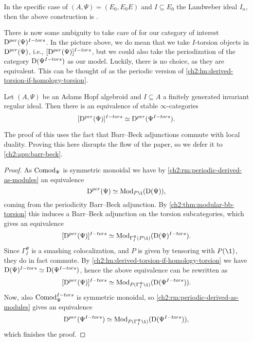 \begin{remark}
    In the specific case of $(A, \Psi) = (E_0, E_0E)$ and $I\subseteq E_0$ the Landweber ideal $I_n$, then the above construction is \cite[3.12]{barthel-schlank-stapleton_2021}. 
\end{remark}

There is now some ambiguity to take care of for our category of interest $\mathrm{D}^{per}(\Psi)^{I-tors}$. In the picture above, we do mean that we take $I$-torsion objects in $\mathrm{D}^{per}(\Psi)$, i.e., $[\mathrm{D}^{per}(\Psi)]^{I-tors}$, but we could also take the periodization of the category $\mathrm{D}(\Psi^{I-tors})$ as our model. Luckily, there is no choice, as they are equivalent. This can be thought of as the periodic version of \cref{ch2:lm:derived-torsion-if-homology-torsion}.

\begin{theorem}
    \label{ch2:thm:pulling-out-torsion}
    Let $(A, \Psi)$ be an Adams Hopf algebroid and $I\subseteq A$ a finitely generated invariant regular ideal. Then there is an equivalence of stable $\infty$-categories 
    $$[\mathrm{D}^{per}(\Psi)]^{I-tors}\simeq \mathrm{D}^{per}(\Psi^{I-tors}).$$
\end{theorem}

The proof of this uses the fact that Barr--Beck adjunctions commute with local duality. Proving this here disrupts the flow of the paper, so we defer it to \cref{ch2:app:barr-beck}. 

\begin{proof}
    As $\mathrm{Comod}_\Psi$ is symmetric monoidal we have by \cref{ch2:rm:periodic-derived-as-modules} an equivalence
    \[\Dper(\Psi)\simeq \Mod_{P\1}(\Der(\Psi)),\]
    coming from the periodicity Barr--Beck adjunction.
    By \cref{ch2:thm:modular-bb-torsion} this induces a Barr--Beck adjunction on the torsion subcategories, which gives an equivalence 
    $$[\Dper(\Psi)]^{I-tors}\simeq \Mod_{\Gamma_I^\Psi (P\1)}(\Der(\Psi)^{I-tors}).$$
    Since $\Gamma_I^\Psi$ is a smashing colocalization, and $P$ is given by tensoring with $P(\1)$, they do in fact commute. By \cref{ch2:lm:derived-torsion-if-homology-torsion} we have $\mathrm{D}(\Psi)^{I-tors}\simeq \mathrm{D}(\Psi^{I-tors})$, hence the above equivalence can be rewritten as
    $$[\Dper(\Psi)]^{I-tors}\simeq \Mod_{P(\Gamma_I^\Psi \1)}(\Der(\Psi^{I-tors})).$$
    Now, also $\mathrm{Comod}_\Psi^{I-tors}$ is symmetric monoidal, so \cref{ch2:rm:periodic-derived-as-modules} gives an equivalence 
    \[\Dper(\Psi^{I-tors})\simeq \Mod_{P(\Gamma_I^\Psi\1)}(\Der(\Psi^{I-tors})),\]which finishes the proof.
\end{proof}


